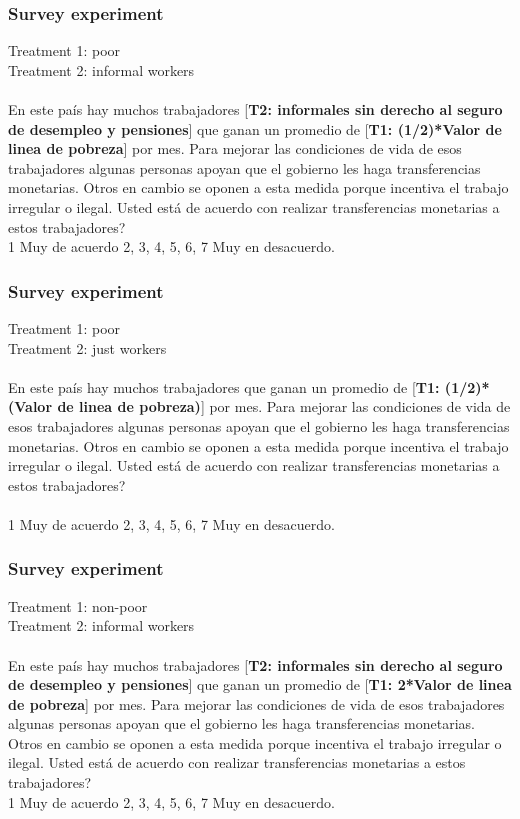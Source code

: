 \documentclass{beamer}\usepackage[]{graphicx}\usepackage[]{color}
\begin{document}
\begin{frame}\frametitle{Survey experiment}

Treatment 1: poor~\\
Treatment 2: informal workers~\\~\\

En este pa\'is hay muchos trabajadores [\textbf{T2: informales sin derecho al seguro de desempleo y pensiones}] que ganan un promedio de [\textbf{T1: (1/2)*Valor de linea de pobreza}] por mes. Para mejorar las condiciones de vida de esos trabajadores algunas personas apoyan que el gobierno les haga transferencias monetarias. Otros en cambio se oponen a esta medida porque incentiva el trabajo irregular o ilegal. Usted est\'a de acuerdo con realizar transferencias monetarias a estos trabajadores? ~\\



1 Muy de acuerdo 2, 3, 4, 5, 6, 7 Muy en desacuerdo.

\end{frame}
\begin{frame}\frametitle{Survey experiment}

Treatment 1: poor~\\
Treatment 2: just workers~\\~\\


En este pa\'is hay muchos trabajadores que ganan un promedio de [\textbf{T1: (1/2)*(Valor de linea de pobreza)}] por mes. Para mejorar las condiciones de vida de esos trabajadores algunas personas apoyan que el gobierno les haga transferencias monetarias. Otros en cambio se oponen a esta medida porque incentiva el trabajo irregular o ilegal. Usted est\'a de acuerdo con realizar transferencias monetarias a estos trabajadores?~\\~\\


1 Muy de acuerdo 2, 3, 4, 5, 6, 7 Muy en desacuerdo.

\end{frame}

\begin{frame}\frametitle{Survey experiment}

Treatment 1: non-poor~\\
Treatment 2: informal workers~\\~\\

En este pa\'is hay muchos trabajadores [\textbf{T2: informales sin derecho al seguro de desempleo y pensiones}] que ganan un promedio de [\textbf{T1: 2*Valor de linea de pobreza}] por mes. Para mejorar las condiciones de vida de esos trabajadores algunas personas apoyan que el gobierno les haga transferencias monetarias. Otros en cambio se oponen a esta medida porque incentiva el trabajo irregular o ilegal. Usted est\'a de acuerdo con realizar transferencias monetarias a estos trabajadores? ~\\



1 Muy de acuerdo 2, 3, 4, 5, 6, 7 Muy en desacuerdo.

\end{frame}
\end{document}
